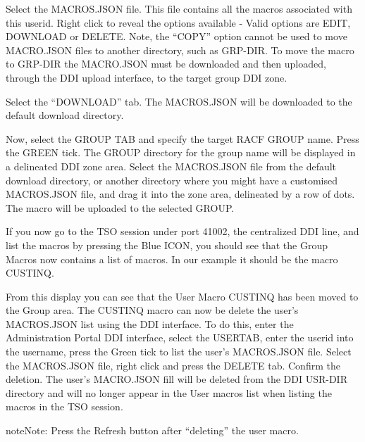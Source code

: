 \documentclass[letterpaper,10pt,english]{sphinxmanual}
\begin{document}


Select the MACROS.JSON file. This file contains all the macros associated with this userid. Right click to reveal the options available - Valid options are EDIT, DOWNLOAD or DELETE.
Note, the “COPY” option cannot be used to move MACRO.JSON files to another directory, such as GRP-DIR. To move the macro to GRP-DIR the MACRO.JSON must be downloaded and then uploaded, through the DDI upload interface, to the target group DDI zone.

Select the “DOWNLOAD” tab. The MACROS.JSON will be downloaded to the default download directory.

Now, select the GROUP TAB and specify the target RACF GROUP name. Press the GREEN tick. The GROUP directory for the group name will be displayed in a delineated DDI zone area. Select the MACROS.JSON file from the default download directory, or another directory where you might have a customised MACROS.JSON file, and drag it into the zone area, delineated by a row of dots. The macro will be uploaded to the selected GROUP.

If you now go to the TSO session under port 41002, the centralized DDI line, and list the macros by pressing the Blue ICON, you should see that the Group Macros now contains a list of macros. In our example it should be the macro CUSTINQ.



From this display you can see that the User Macro CUSTINQ has been moved to the Group area. The CUSTINQ macro can now be delete the user’s MACROS.JSON list using the DDI interface. To do this, enter the Administration Portal DDI interface, select the USERTAB, enter the userid into the username, press the Green tick to list the user’s MACROS.JSON file. Select the MACROS.JSON file, right click and press the DELETE tab. Confirm the deletion. The user’s MACRO.JSON fill will be deleted from the DDI USR-DIR directory and will no longer appear in the User macros list when listing the macros in the TSO session.

\begin{sphinxadmonition}{note}{Note:}
Press the Refresh button after “deleting” the user macro.
\end{sphinxadmonition}

\end{document}

